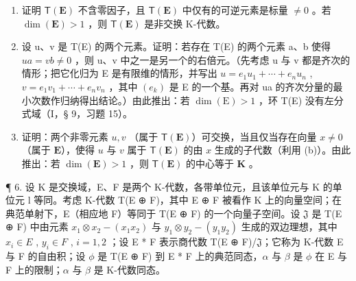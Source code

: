 \begin{enumerate}
\def\labelenumi{(\alph{enumi})}
\item
  证明 \(\mathsf{T}(\mathbf{E})\) 不含零因子，且 \(\mathsf{T}(\mathbf{E})\) 中仅有的可逆元素是标量 \(\neq 0\) 。若 \(\dim (\mathbf{E}) > 1\) ，则 \(\mathsf{T}(\mathbf{E})\) 是非交换 K-代数。
\item
  设 u、v 是 T(E) 的两个元素。证明：若存在 T(E) 的两个元素 a、b 使得 \(ua = vb \neq 0\) ，则 u、v 中之一是另一个的右倍元。（先考虑 u 与 v 都是齐次的情形；把它化归为 E 是有限维的情形，并写出 \(u = e_{1}u_{1} + \cdots + e_{n}u_{n}\) , \(v = e_{1}v_{1} + \cdots + e_{n}v_{n}\) ，其中 \((e_{k})\) 是 E 的一个基。再对 ua 的齐次分量的最小次数作归纳得出结论。）由此推出：若 \(\dim(\mathrm{E}) > 1\) ，环 T(E) 没有左分式域（I，§ 9，习题 15）。
\item
  证明：两个非零元素 \(u, v\) （属于 \(\mathsf{T}(\mathbf{E})\)）可交换，当且仅当存在向量 \(x \neq 0\) （属于 \(\mathbf{E}\)），使得 \(u\) 与 \(v\) 属于 \(\mathsf{T}(\mathbf{E})\) 的由 \(x\) 生成的子代数（利用 (b)）。由此推出：若 \(\dim(\mathbf{E}) > 1\) ，则 \(\mathsf{T}(\mathbf{E})\) 的中心等于 \(\mathbf{K}\) 。
\end{enumerate}

¶ 6. 设 K 是交换域，E、F 是两个 K-代数，各带单位元，且该单位元与 K 的单位元 l 等同。考虑 K-代数 T(E ⊕ F)，其中 E ⊕ F 被看作 K 上的向量空间；在典范单射下，E（相应地 F）等同于 T(E ⊕ F) 的一个向量子空间。设 \(\mathfrak{J}\) 是 T(E ⊕ F) 中由元素 \(x_1 \otimes x_2 - (x_1 x_2)\) 与 \(y_1 \otimes y_2 - (y_1 y_2)\) 生成的双边理想，其中 \(x_i \in E\) , \(y_i \in F\) , \(i = 1, 2\) ；设 E * F 表示商代数 T(E ⊕ F)/\(\mathfrak{J}\)；它称为 K-代数 E 与 F 的自由积；设 \(\phi\) 是 T(E ⊕ F) 到 E * F 上的典范同态，\(\alpha\) 与 \(\beta\) 是 \(\phi\) 在 E 与 F 上的限制；\(\alpha\) 与 \(\beta\) 是 K-代数同态。

